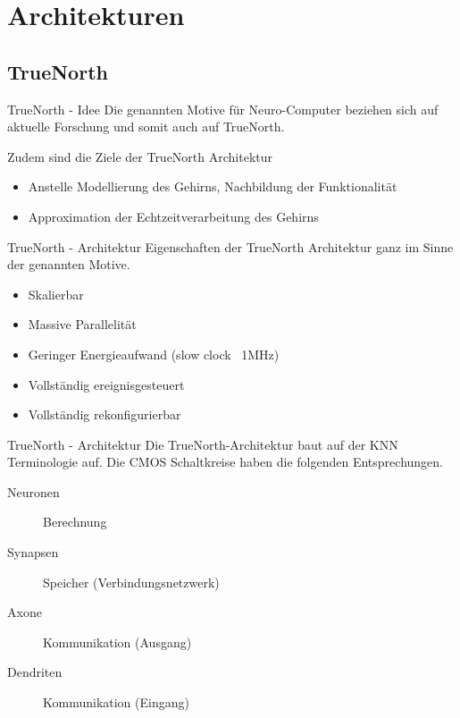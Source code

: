 \section{Architekturen}

\subsection{TrueNorth}

\begin{slide}{TrueNorth - Idee}
	Die genannten Motive für Neuro-Computer beziehen sich auf aktuelle Forschung und somit auch auf TrueNorth.
	
	Zudem sind die Ziele der TrueNorth Architektur

	\begin{itemize}
		\item Anstelle Modellierung des Gehirns, Nachbildung der Funktionalität
		\item Approximation der Echtzeitverarbeitung des Gehirns
	\end{itemize}
\end{slide}

\begin{slide}{TrueNorth - Architektur}
	Eigenschaften der TrueNorth Architektur ganz im Sinne der genannten Motive.
	
	\begin{itemize}
		\item Skalierbar
		\item Massive Parallelität
		\item Geringer Energieaufwand (slow clock ~1MHz)
		\item Vollständig ereignisgesteuert
		\item Vollständig rekonfigurierbar
	\end{itemize}
\end{slide}

\begin{slide}{TrueNorth - Architektur}
	Die TrueNorth-Architektur baut auf der KNN Terminologie auf. Die CMOS Schaltkreise haben die folgenden Entsprechungen.
	
	\begin{description}
	    \item[Neuronen] Berechnung
	    \item[Synapsen] Speicher (Verbindungsnetzwerk)
	    \item[Axone] Kommunikation (Ausgang)
	    \item[Dendriten] Kommunikation (Eingang)
	\end{description}
\end{slide}

